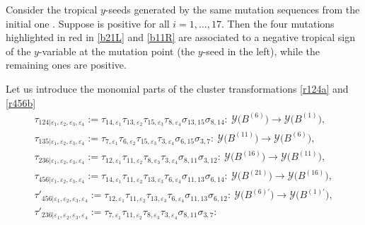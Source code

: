 \documentclass[11pt]{article}
\numberwithin{equation}{section}
\numberwithin{equation}{section}
\begin{document}
\begin{Remark}\label{re:red}
 Consider the tropical $y$-seeds generated by the same mutation
 sequences from the initial one
 . Suppose
  is positive for all $i=1, \dots,
 17$. Then the four mutations highlighted in red in \eqref{b21L}
 and \eqref{b11R} are associated to a negative tropical sign of the
 $y$-variable at the mutation point (the $y$-seed in the left), while
 the remaining ones are positive.
\end{Remark}

Let us introduce the monomial parts of the cluster transformations \eqref{r124a} and \eqref{r456b}
\begin{gather*}
\tau_{124 | \varepsilon_1,\varepsilon_2,\varepsilon_3,\varepsilon_4} :=
\tau_{14,\varepsilon_1}\tau_{13,\varepsilon_2}\tau_{15,\varepsilon_3}\tau_{8,\varepsilon_4}\sigma_{13,15}\sigma_{8,14}\colon\
 \mathcal{Y}\bigl(B^{(6)}\bigr) \rightarrow \mathcal{Y}\bigl(B^{(1)}\bigr),
\\
\tau_{135 | \varepsilon_1,\varepsilon_2,\varepsilon_3,\varepsilon_4} :=
\tau_{7,\varepsilon_1}\tau_{6,\varepsilon_2}\tau_{15,\varepsilon_3}\tau_{3,\varepsilon_4}\sigma_{6,15}\sigma_{3,7}\colon\
 \mathcal{Y}\bigl(B^{(11)}\bigr) \rightarrow \mathcal{Y}\bigl(B^{(6)}\bigr),
\\
\tau_{236 | \varepsilon_1,\varepsilon_2,\varepsilon_3,\varepsilon_4} :=
\tau_{12,\varepsilon_1}\tau_{11,\varepsilon_2}\tau_{8,\varepsilon_3}\tau_{3,\varepsilon_4}\sigma_{8,11}\sigma_{3,12}\colon\
 \mathcal{Y}\bigl(B^{(16)}\bigr) \rightarrow \mathcal{Y}\bigl(B^{(11)}\bigr),
\\
\tau_{456 | \varepsilon_1,\varepsilon_2,\varepsilon_3,\varepsilon_4} :=
\tau_{14,\varepsilon_1}\tau_{11,\varepsilon_2}\tau_{13,\varepsilon_3}\tau_{6,\varepsilon_4}\sigma_{11,13}\sigma_{6,14}\colon\
 \mathcal{Y}\bigl(B^{(21)}\bigr) \rightarrow \mathcal{Y}\bigl(B^{(16)}\bigr),
\\
\tau'_{456 | \varepsilon_1,\varepsilon_2,\varepsilon_3,\varepsilon_4} :=
\tau_{12,\varepsilon_1}\tau_{11,\varepsilon_2}\tau_{13,\varepsilon_3}\tau_{6,\varepsilon_4}\sigma_{11,13}\sigma_{6,12}\colon\
 \mathcal{Y}\bigl(B^{(6)\prime}\bigr) \rightarrow \mathcal{Y}\bigl(B^{(1)\prime}\bigr),
\\
\tau'_{236 | \varepsilon_1,\varepsilon_2,\varepsilon_3,\varepsilon_4} :=
\tau_{7,\varepsilon_1}\tau_{11,\varepsilon_2}\tau_{8,\varepsilon_3}\tau_{3,\varepsilon_4}\sigma_{8,11}\sigma_{3,7}\colon\

\end{gather*}
\end{document}

